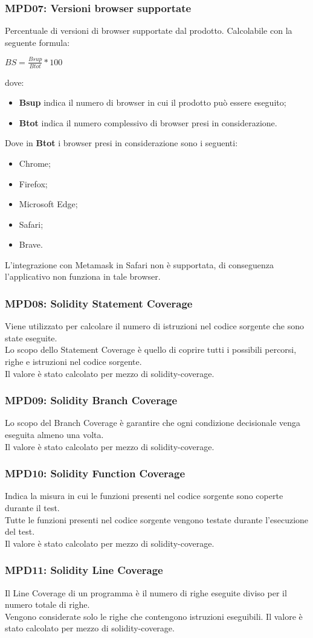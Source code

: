 \subsubsection{MPD07: Versioni browser supportate}
Percentuale di versioni di browser supportate dal prodotto.
Calcolabile con la seguente formula:
\begin{center}
    $BS = \displaystyle \frac{Bsup}{Btot}*100$
\end{center}
dove:
\begin{itemize}
    \item \textbf{Bsup} indica il numero di browser in cui il prodotto può essere eseguito;
    \item \textbf{Btot} indica il numero complessivo di browser presi in considerazione.
\end{itemize}
Dove in \textbf{Btot} i browser presi in considerazione sono i seguenti:
\begin{itemize}
    \item Chrome;
    \item Firefox;
    \item Microsoft Edge;
    \item Safari;
    \item Brave.
\end {itemize} 
L'integrazione con Metamask in Safari non è supportata, di conseguenza l'applicativo non funziona in tale browser.

\subsubsection{MPD08: Solidity Statement Coverage}
Viene utilizzato per calcolare il numero di istruzioni nel codice sorgente che sono state eseguite.\\
Lo scopo dello Statement Coverage è quello di coprire tutti i possibili percorsi, righe e istruzioni nel codice sorgente.\\
Il valore è stato calcolato per mezzo di solidity-coverage.

\subsubsection{MPD09: Solidity Branch Coverage}
Lo scopo del Branch Coverage è garantire che ogni condizione decisionale venga eseguita almeno una volta.\\
Il valore è stato calcolato per mezzo di solidity-coverage.

\subsubsection{MPD10: Solidity Function Coverage}
Indica la misura in cui le funzioni presenti nel codice sorgente sono coperte durante il test.\\
Tutte le funzioni presenti nel codice sorgente vengono testate durante l'esecuzione del test.\\
Il valore è stato calcolato per mezzo di solidity-coverage.

\subsubsection{MPD11: Solidity Line Coverage}
Il Line Coverage di un programma è il numero di righe eseguite diviso per il numero totale di righe.\\
Vengono considerate solo le righe che contengono istruzioni eseguibili.
Il valore è stato calcolato per mezzo di solidity-coverage.
